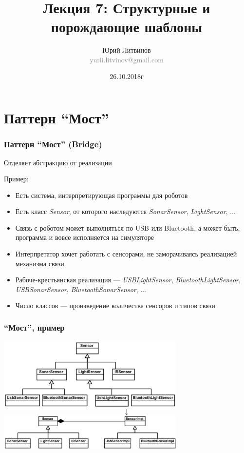 \documentclass[xetex,mathserif,serif]{beamer}
\title[Шаблоны]{Лекция 7: Структурные и порождающие шаблоны}
\author[Юрий Литвинов]{Юрий Литвинов\\\small{\textcolor{gray}{yurii.litvinov@gmail.com}}}
\date{26.10.2018г}
\begin{document}
	\frame{\titlepage}

	\section{Паттерн ``Мост''}

	\begin{frame}
		\frametitle{Паттерн ``Мост'' (Bridge)}
		Отделяет абстракцию от реализации

		Пример:
		\begin{itemize}
			\item Есть система, интерпретирующая программы для роботов
			\item Есть класс \textit{Sensor}, от которого наследуются \textit{SonarSensor}, \textit{LightSensor}, ...
			\item Связь с роботом может выполняться по USB или Bluetooth, а может быть, программа и вовсе исполняется на симуляторе
			\item Интерпретатор хочет работать с сенсорами, не заморачиваясь реализацией механизма связи
			\item Рабоче-крестьянская реализация --- \textit{USBLightSensor}, \textit{BluetoothLightSensor}, \textit{USBSonarSensor}, \textit{BluetoothSonarSensor}, ...
			\item Число классов --- произведение количества сенсоров и типов связи
		\end{itemize}
	\end{frame}

	\begin{frame}
		\frametitle{``Мост'', пример}
		\begin{center}
			\includegraphics[width=0.7\textwidth]{noBridge.png}
			\Huge{$$\downarrow$$}
			\includegraphics[width=0.7\textwidth]{bridge.png}
		\end{center}
	\end{frame}
\end{document}
